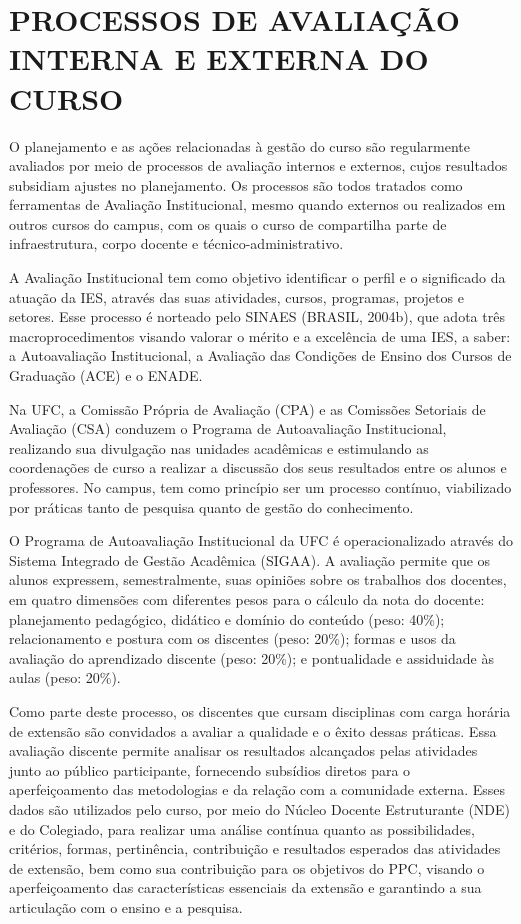 \chapter{PROCESSOS DE AVALIAÇÃO INTERNA E EXTERNA DO CURSO}
\label{cap:processos-de-avaliacao-interna}

O planejamento e as ações relacionadas à gestão do curso são regularmente avaliados por meio de processos de avaliação internos e externos, cujos resultados subsidiam ajustes no planejamento. Os processos são todos tratados como ferramentas de Avaliação Institucional, mesmo quando externos ou realizados em outros cursos do campus, com os quais o curso de \nomedocurso compartilha parte de infraestrutura, corpo docente e técnico-administrativo.

A Avaliação Institucional tem como objetivo identificar o perfil e o significado da atuação da IES, através das suas atividades, cursos, programas, projetos e setores. Esse processo é norteado pelo SINAES (BRASIL, 2004b), que adota três macroprocedimentos visando valorar o mérito e a excelência de uma IES, a saber: a Autoavaliação Institucional, a Avaliação das Condições de Ensino dos Cursos de Graduação (ACE) e o ENADE.

Na UFC, a Comissão Própria de Avaliação (CPA) e as Comissões Setoriais de Avaliação (CSA) conduzem o Programa de Autoavaliação Institucional, realizando sua divulgação nas unidades acadêmicas e estimulando as coordenações de curso a realizar a discussão dos seus resultados entre os alunos e professores. No campus, tem como princípio ser um processo contínuo, viabilizado por práticas tanto de pesquisa quanto de gestão do conhecimento.

O Programa de Autoavaliação Institucional da UFC é operacionalizado através do Sistema Integrado de Gestão Acadêmica (SIGAA). A avaliação permite que os alunos expressem, semestralmente, suas opiniões sobre os trabalhos dos docentes, em quatro dimensões com diferentes pesos para o cálculo da nota do docente: planejamento pedagógico, didático e domínio do conteúdo (peso: 40\%); relacionamento e postura com os discentes (peso: 20\%); formas e usos da avaliação do aprendizado discente (peso: 20\%); e pontualidade e assiduidade às aulas (peso: 20\%).

Como parte deste processo, os discentes que cursam disciplinas com carga horária de extensão são convidados a avaliar a qualidade e o êxito dessas práticas. Essa avaliação discente permite analisar os resultados alcançados pelas atividades junto ao público participante, fornecendo subsídios diretos para o aperfeiçoamento das metodologias e da relação com a comunidade externa. Esses dados são utilizados pelo curso, por meio do Núcleo Docente Estruturante (NDE) e do Colegiado, para realizar uma análise contínua quanto as possibilidades, critérios, formas, pertinência, contribuição e resultados esperados das atividades de extensão, bem como sua contribuição para os objetivos do PPC, visando o aperfeiçoamento das características essenciais da extensão e garantindo a sua articulação com o ensino e a pesquisa.

